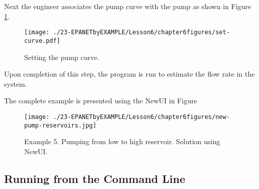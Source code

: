Next the engineer associates the pump curve with the pump as shown in Figure \ref{fig:set-curve}.
\begin{figure}[h!] %
   \centering
   \texttt{[image: ./23-EPANETbyEXAMPLE/Lesson6/chapter6figures/set-curve.pdf]} 
   \caption{Setting the pump curve.}
   \label{fig:set-curve}
\end{figure}

Upon completion of this step, the program is run to estimate the flow rate in the system.

The complete example is presented using the NewUI in Figure 

\begin{figure}[h!] %
   \centering
   \texttt{[image: ./23-EPANETbyEXAMPLE/Lesson6/chapter6figures/new-pump-reservoirs.jpg]} 
   \caption{Example 5.  Pumping from low to high reservoir.  Solution using NewUI.}
   \label{fig:new-pump-reservoirs}
\end{figure}

\clearpage


\subsection{Running from the Command Line}


